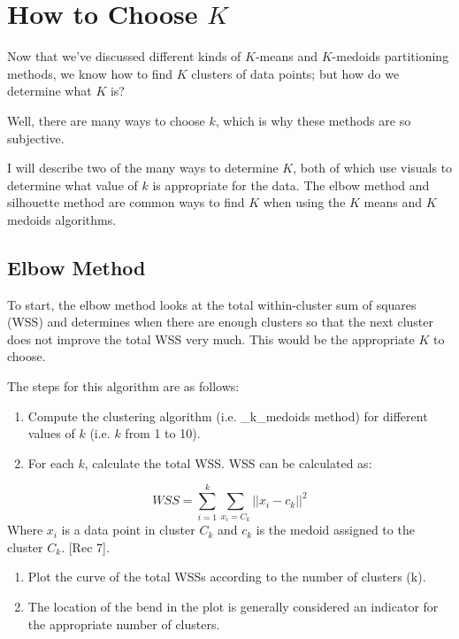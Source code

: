 \documentclass[12pt,twoside]{amherstthesis}
\begin{document}
  \section{\texorpdfstring{How to Choose
  \(K\)}{How to Choose K}}\label{how-to-choose-k}
  
  Now that we've discussed different kinds of \(K\)-means and
  \(K\)-medoids partitioning methods, we know how to find \(K\) clusters
  of data points; but how do we determine what \(K\) is?
  
  Well, there are many ways to choose \(k\), which is why these methods
  are so subjective.
  
  I will describe two of the many ways to determine \(K\), both of which
  use visuals to determine what value of \(k\) is appropriate for the
  data. The elbow method and silhouette method are common ways to find
  \(K\) when using the \(K\) means and \(K\) medoids algorithms.
  
  \subsection{Elbow Method}\label{elbow-method}
  
  To start, the elbow method looks at the total within-cluster sum of
  squares (WSS) and determines when there are enough clusters so that the
  next cluster does not improve the total WSS very much. This would be the
  appropriate \(K\) to choose.
  
  The steps for this algorithm are as follows:
  
  \begin{enumerate}
  \def\labelenumi{\arabic{enumi}.}
  \item
    Compute the clustering algorithm (i.e. \_k\_medoids method) for
    different values of \(k\) (i.e. \(k\) from 1 to 10).
  \item
    For each \(k\), calculate the total WSS. WSS can be calculated as:
  \end{enumerate}
  
  \[WSS= \sum_{i=1}^k \sum_{x_i = C_k} ||{{x_i- c_k}}||^2\] Where \(x_i\)
  is a data point in cluster \(C_k\) and \(c_k\) is the medoid assigned to
  the cluster \(C_k\). {[}Rec 7{]}.
  
  \begin{enumerate}
  \def\labelenumi{\arabic{enumi}.}
  \setcounter{enumi}{2}
  \item
    Plot the curve of the total WSSs according to the number of clusters
    (k).
  \item
    The location of the bend in the plot is generally considered an
    indicator for the appropriate number of clusters.
  \end{enumerate}
  
\end{document}

